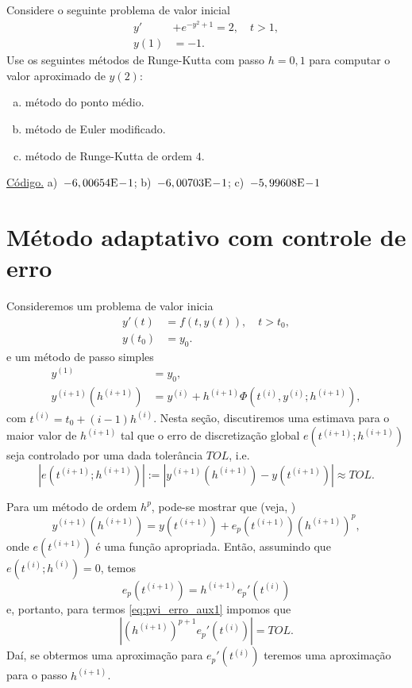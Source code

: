 \begin{exer}
  Considere o seguinte problema de valor inicial
  \begin{align}
    y' &+ e^{-y^2+1} = 2,\quad t>1,\\
    y(1) &= -1.
  \end{align}
Use os seguintes métodos de Runge-Kutta com passo $h=0,1$ para computar o valor aproximado de $y(2)$:
\begin{enumerate}[a)]
\item método do ponto médio.
\item método de Euler modificado.
\item método de Runge-Kutta de ordem $4$.
\end{enumerate}
\end{exer}
\begin{resp}
  \ifisoctave 
  \href{https://github.com/phkonzen/notas/blob/master/src/MatematicaNumerica/cap_pvi/dados/exer_RK_pvi1/exer_RK_pvi1.m}{Código.} 
  \fi
  a)~$-6,00654\mathrm{E}\!-\!1$; b)~$-6,00703\mathrm{E}\!-\!1$; c)~$-5,99608\mathrm{E}\!-\!1$
\end{resp}

\section{Método adaptativo com controle de erro}\label{cap_pvi_met_adap}

Consideremos um problema de valor inicia
\begin{align}
  y'(t) &= f(t,y(t)),\quad t>t_0,\\
  y(t_0) &= y_0.
\end{align}
e um método de passo simples
\begin{align}
  y^{(1)} &= y_0,\\
  y^{(i+1)}(h^{(i+1)}) &= y^{(i)} + h^{(i+1)}\Phi(t^{(i)},y^{(i)};h^{(i+1)}),
\end{align}
com $t^{(i)} = t_0 + (i-1)h^{(i)}$. Nesta seção, discutiremos uma estimava para o maior valor de $h^{(i+1)}$ tal que o erro de discretização global $e(t^{(i+1)};h^{(i+1)})$ seja controlado por uma dada tolerância $TOL$, i.e.
\begin{equation}\label{eq:pvi_erro_aux1}
  |e(t^{(i+1)};h^{(i+1)})| := |y^{(i+1)}(h^{(i+1)}) - y(t^{(i+1)})| \approx TOL.
\end{equation}

Para um método de ordem $h^p$, pode-se mostrar que (veja, \cite[Cap. 7, Seç. 7.2]{Isaacson1994a})
\begin{equation}\label{eq:pvi_erro_aux0}
  y^{(i+1)}(h^{(i+1)}) = y(t^{(i+1)}) + e_p(t^{(i+1)})(h^{(i+1)})^p,
\end{equation}
onde $e(t^{(i+1)})$ é uma função apropriada. Então, assumindo que $e(t^{(i)};h^{(i)})=0$, temos
\begin{equation}\label{eq:pvi_erro_aux2}
  e_p(t^{(i+1)}) = h^{(i+1)}e_p'(t^{(i)})
\end{equation}
e, portanto, para termos \eqref{eq:pvi_erro_aux1} impomos que
\begin{equation}\label{eq:pvi_erro_aux4}
  |(h^{(i+1)})^{p+1}e_p'(t^{(i)})| = TOL.
\end{equation}
Daí, se obtermos uma aproximação para $e_p'(t^{(i)})$ teremos uma aproximação para o passo $h^{(i+1)}$.

